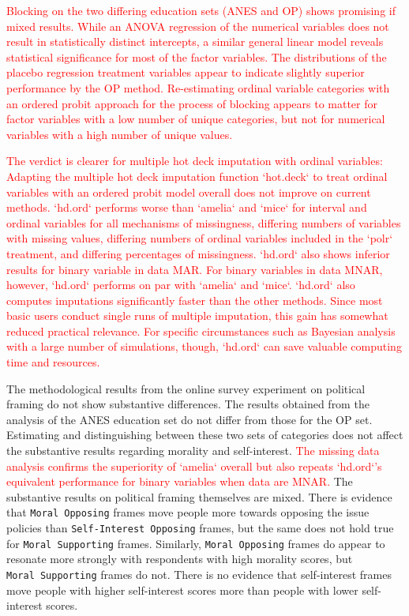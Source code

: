 \documentclass[12pt,econ]{sources/authesis}
\begin{document}
\textcolor{red}{Blocking on the two differing education sets (ANES and OP) shows promising if mixed results. While an ANOVA regression of the numerical variables does not result in statistically distinct intercepts, a similar general linear model reveals statistical significance for most of the factor variables. The distributions of the placebo regression treatment variables appear to indicate slightly superior performance by the OP method. Re-estimating ordinal variable categories with an ordered probit approach for the process of blocking appears to matter for factor variables with a low number of unique categories, but not for numerical variables with a high number of unique values.}

\textcolor{red}{The verdict is clearer for multiple hot deck imputation with ordinal variables: Adapting the multiple hot deck imputation function `hot.deck` to treat ordinal variables with an ordered probit model overall does not improve on current methods. `hd.ord` performs worse than `amelia` and `mice` for interval and ordinal variables for all mechanisms of missingness, differing numbers of variables with missing values, differing numbers of ordinal variables included in the `polr` treatment, and differing percentages of missingness. `hd.ord` also shows inferior results for binary variable in data MAR. For binary variables in data MNAR, however, `hd.ord` performs on par with `amelia` and `mice`. `hd.ord` also computes imputations significantly faster than the other methods. Since most basic users conduct single runs of multiple imputation, this gain has somewhat reduced practical relevance. For specific circumstances such as Bayesian analysis with a large number of simulations, though, `hd.ord` can save valuable computing time and resources.}

The methodological results from the online survey experiment on political framing do not show substantive differences. The results obtained from the analysis of the ANES education set do not differ from those for the OP set. Estimating and distinguishing between these two sets of categories does not affect the substantive results regarding morality and self-interest. \textcolor{red}{The missing data analysis confirms the superiority of `amelia` overall but also repeats `hd.ord`'s equivalent performance for binary variables when data are MNAR.} The substantive results on political framing themselves are mixed. There is evidence that \texttt{Moral\ Opposing} frames move people more towards opposing the issue policies than \texttt{Self-Interest\ Opposing} frames, but the same does not hold true for \texttt{Moral\ Supporting} frames. Similarly, \texttt{Moral\ Opposing} frames do appear to resonate more strongly with respondents with high morality scores, but \texttt{Moral\ Supporting} frames do not. There is no evidence that self-interest frames move people with higher self-interest scores more than people with lower self-interest scores.
\end{document}
